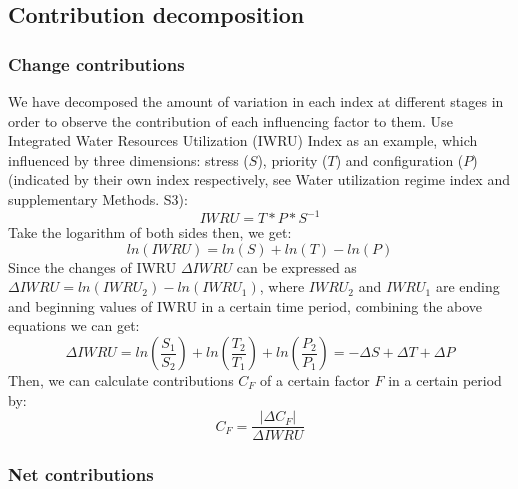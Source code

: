 \documentclass[9pt, twocolumn, twoside, lineno]{pnas-new}
\begin{document}
{	%
	\subsection*{Contribution decomposition}
	\subsubsection*{Change contributions}
		We have decomposed the amount of variation in each index at different stages in order to observe the contribution of each influencing factor to them. Use Integrated Water Resources Utilization (IWRU) Index as an example, which influenced by three dimensions: stress ($S$), priority ($T$) and configuration ($P$) (indicated by their own index respectively, see Water utilization regime index and supplementary Methods. S3):
		$$ IWRU = T * P * S ^ {-1} $$
		Take the logarithm of both sides then, we get:
		$$ ln(IWRU) = ln(S) + ln(T) - ln(P) $$
		Since the changes of IWRU $\Delta IWRU$ can be expressed as $\Delta IWRU = ln(IWRU_2) - ln(IWRU_1)$, where $IWRU_2$ and $IWRU_1$ are ending and beginning values of IWRU in a certain time period, combining the above equations we can get:
		$$ \Delta IWRU = ln(\frac{S_1}{S_2}) + ln(\frac{T_2}{T_1}) + ln(\frac{P_2}{P_1}) = -\Delta S + \Delta T + \Delta P $$
		Then, we can calculate contributions $C_F$ of a certain factor $F$ in a certain period by:
		$$ C_{F} = \frac{|\Delta C_{F}|}{\Delta IWRU}$$
		
	\subsubsection*{Net contributions}
		}

\showmatmethods{} %


\showacknow{} %


	
\end{document}
